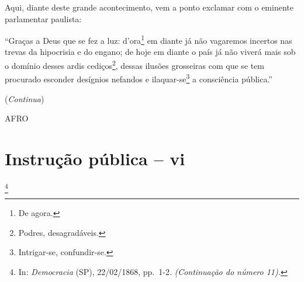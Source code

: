 Aqui, diante deste grande acontecimento, vem a ponto exclamar com o
eminente parlamentar paulista:

``Graças a Deus que se fez a luz: d'ora\footnote{De agora.} em diante
já não vagaremos incertos nas trevas da hipocrisia e do engano; de hoje
em diante o país já não viverá mais sob o domínio desses ardis
cediços\footnote{Podres, desagradáveis.}, dessas ilusões grosseiras
com que se tem procurado esconder desígnios nefandos e
ilaquar-se\footnote{Intrigar-se, confundir-se.} a consciência
pública.''

(\emph{Continua})

AFRO

\chapter{Instrução pública -- vi}\footnote{In: \emph{Democracia} (SP),
  22/02/1868, pp.~1-2. \emph{(Continuação do número 11).}}

